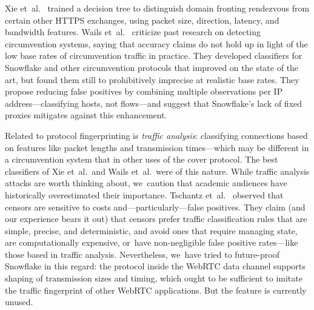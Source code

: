 \documentclass[letterpaper,twocolumn]{article}
\newcommand{\firstterm}[1]{\textit{#1}}
\begin{document}
Xie et~al.~\cite{Xie2023a} trained a decision tree to
distinguish domain fronting rendezvous
from certain other HTTPS exchanges,
using
packet size, direction, latency, and bandwidth features.
Wails et~al.~\cite{Wails2024a}
criticize past research on detecting circumvention systems,
saying that accuracy claims do not hold up
in light of the low base rates of circumvention traffic in practice.
They developed classifiers
for Snowflake and other circumvention protocols
that improved on the state of the art,
but found them still to prohibitively imprecise at realistic base rates.
They propose reducing false positives by combining
multiple observations per IP address---classifying hosts,
not flows---and suggest that Snowflake's lack of
fixed proxies mitigates against this enhancement.

Related to protocol fingerprinting is \firstterm{traffic analysis}:
classifying connections based on features like
packet lengths and transmission times---which
may be different in a circumvention system
that in other uses of the cover protocol.
The best classifiers of Xie et~al.\ and Wails et~al.\ were of this nature.
While traffic analysis attacks are worth thinking about,
we~caution that academic audiences
have historically overestimated their importance.
Tschantz et~al.~\cite[\S VII]{Tschantz2016a} observed
that censors are sensitive to costs
and---particularly---false positives.
They claim (and our experience bears it out)
that censors prefer traffic classification rules
that are simple, precise, and deterministic,
and avoid ones that
require managing state,
are computationally expensive,
or~have non-negligible false positive rates---like
those based in traffic analysis.
Nevertheless, we~have tried to future-proof Snowflake in this regard:
the protocol inside the WebRTC data channel supports
shaping of transmission sizes and timing,
which ought to be sufficient to imitate the traffic fingerprint
of other WebRTC applications.
But the feature is currently unused.
\end{document}
